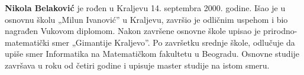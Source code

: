 \documentclass[12pt,oneside]{memoir}
\begin{document}
\backmatter

\begin{biografija}
  \textbf{Nikola Belaković} je rođen u Kraljevu 14. septembra 2000. godine.
  Išao je u osnovnu školu „Milun Ivanović” u Kraljevu, završio je odličnim uspehom
  i bio nagrađen Vukovom diplomom. Nakon završene osnovne škole
  upisao je prirodno-matematički smer „Gimantije Kraljevo”.
  Po završetku srednje škole, odlučuje da upiše smer Informatika na Matematičkom fakultetu u Beogradu.
  Osnovne studije završava u roku od četiri godine i upisuje master studije na istom smeru.
  

\end{biografija}
\end{document}
